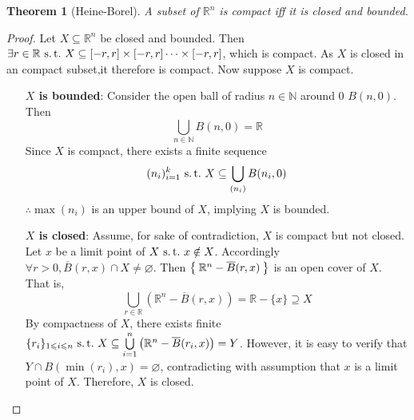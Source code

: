 \documentclass[12pt]{amsart}
\newcommand{\bbR}{\mathbb{R}}
\newcommand{\bbN}{\mathbb{N}}
\newcommand{\suchthat}{\operatorname{\thinspace s.t. \thinspace}}
\theoremstyle{plain}
\newtheorem*{thm}{Theorem}
\theoremstyle{remark}
\theoremstyle{definition}
\begin{document}
\begin{thm}[Heine-Borel]
A subset of $\bbR^n$ is compact iff it is closed and bounded.
\end{thm}
\begin{proof}
Let $X \subseteq \bbR^n$ be closed and bounded. Then $\exists r \in \bbR \suchthat X\subseteq [-r,r] \times [-r,r] \dots \times [-r,r]$, which is compact. 
\newline
As $X$ is closed in an compact subset,it therefore is compact.
\newline
Now suppose $X$ is compact.
\begin{itemize}
\item[{\bfseries $X$ is bounded}:] 
Consider the open ball of radius $n \in \bbN$ around $0$ $B(n,0)$. Then
\begin{equation*}
\bigcup\limits_{n\in\bbN}B(n,0) = \bbR
\end{equation*}
Since $X$ is compact, there exists a finite sequence
\begin{equation*}
(n_i)_{i=1}^k \suchthat X \subseteq \bigcup\limits_{(n_i)}B(n_i, 0)
\end{equation*}
$\therefore \max({n_i})$ is an upper bound of $X$, implying $X$ is bounded.
\item[{\bfseries $X$ is closed}:] 
Assume, for sake of contradiction, $X$ is compact but not closed.
\newline
Let $x$ be a limit point of $X \suchthat x \notin X$. Accordingly $\forall r > 0, \overline{B}(r, x) \cap X \neq \varnothing$. Then
$\Set{\bbR^n - \overline{B}(r,x)}$ is an open cover of $X$. That is,
\begin{equation*}
\bigcup\limits_{r\in \bbR}\left( \bbR^n - \overline{B}(r, x) \right) = \bbR - \{x\} \supseteq X
\end{equation*}
By compactness of $X$, there exists finite $\{r_i\}_{1\leqslant i\leqslant n} \suchthat X \subseteq \bigcup\limits_{i=1}^n\left( \bbR^n-\overline{B}(r_i,x) \right) = Y$.
\newline
However, it is easy to verify that $Y \cap B(\min(r_i), x) = \varnothing$, contradicting with assumption that $x$ is a limit point of $X$.
\newline
Therefore, $X$ is closed.
\end{itemize}
\end{proof}
\end{document}
